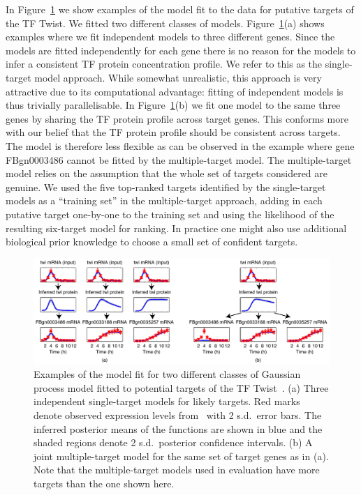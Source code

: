 \documentclass{article}
\begin{document}
In Figure~\ref{fig:gpdisim_models} we show examples of the model fit
to the data for putative targets of the TF Twist. We fitted two
different classes of models. Figure~\ref{fig:gpdisim_models}(a) shows
examples where we fit independent models to three different
genes. Since the models are fitted independently for each gene there
is no reason for the models to infer a consistent TF protein
concentration profile. We refer to this as the single-target model
approach. While somewhat unrealistic, this approach is very attractive
due to its computational advantage: fitting of independent models is
thus trivially parallelisable. In Figure~\ref{fig:gpdisim_models}(b)
we fit one model to the same three genes by sharing the TF protein
profile across target genes. This conforms more with our belief that
the TF protein profile should be consistent across targets. The model
is therefore less flexible as can be observed in the example where
gene FBgn0003486 cannot be fitted by the multiple-target model. The
multiple-target model relies on the assumption that the whole set of
targets considered are genuine. We used the five top-ranked targets
identified by the single-target models as a ``training set'' in the
multiple-target approach, adding in each putative target one-by-one to
the training set and using the likelihood of the resulting six-target
model for ranking. In practice one might also use additional
biological prior knowledge to choose a small set of confident targets.

\begin{figure}[tb]
  \centering
  \includegraphics[width=12cm]{../disim_pnas/fig1}
  \caption{Examples of the model fit for two different classes of 
    Gaussian process model fitted to potential targets of the TF Twist~\citep[from][]{Honkela:modelbased10}. (a) Three independent single-target models
    for likely targets. Red marks denote observed expression
    levels from~\cite{Tomancak:systematic02} with 2 s.d.\ error bars.
    The inferred posterior means of the functions are shown in blue
    and the shaded regions denote 2 s.d.\ posterior confidence
    intervals. (b) A joint multiple-target model for
    the same set of target genes as in (a). Note that
    the multiple-target models used in evaluation have more targets
    than the one shown here.\label{fig:gpdisim_models}
}
\end{figure}
\end{document}
